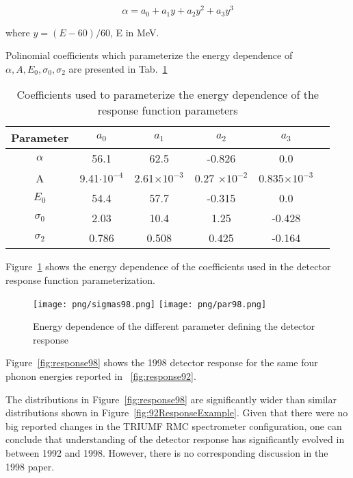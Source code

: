 \begin{equation}
  \alpha= a_0+a_1y+a_2y^2+a_3y^3
\end{equation}

where $y= (E-60)/60$, E in MeV.

Polinomial coefficients which parameterize the energy dependence of
$\alpha, A, E_0, \sigma_0, \sigma_2$ are presented in Tab.~\ref{tab:param98}

\begin{table}[!h] \label{tab:param98}
  \begin{center}
    \begin{tabular}{| c | c | c | c | c | c | }
      \hline
      Parameter  & $a_0$              & $a_1$ & $a_2$ & $a_3$ \\ \hline
      $\alpha$   & 56.1               &62.5 & -0.826 & 0.0  \\ \hline
      A          & 9.41$\cdot 10^{-4}$ & 2.61$\times 10^{-3}$ &0.27 $\times 10^{-2}$ &0.835$\times 10^{-3}$   \\ \hline
      $E_0$      & 54.4               & 57.7 & -0.315 &0.0 \\ \hline
      $\sigma_0$ & 2.03               &10.4 &1.25 & -0.428\\ \hline
      $\sigma_2$ & 0.786              & 0.508 & 0.425 & -0.164\\ \hline
    \end{tabular}
  \end{center}
  \caption{Coefficients used to parameterize the energy dependence of the response function parameters}
\end{table}

Figure~\ref{fig:parameters98} shows the energy dependence of the coefficients used
in the detector response function parameterization.

\begin{figure}[!h]
  \begin{center}
    \texttt{[image: png/sigmas98.png]} 
    \texttt{[image: png/par98.png]} 
  \end{center}
  \caption{Energy dependence of the different parameter defining the detector response}
  \label{fig:parameters98}
\end{figure}

Figure~\ref{fig:response98} shows the 1998 detector response for the same four phonon energies reported in ~\ref{fig:response92}.

The distributions in Figure~\ref{fig:response98} are significantly wider than similar distributions
shown in Figure~\ref{fig:92ResponseExample}. Given that there were no big reported changes in the TRIUMF
RMC spectrometer configuration, one can conclude that understanding of the detector response has
significantly evolved in between 1992 and 1998. However, there is no corresponding discussion 
in the 1998 paper. 

